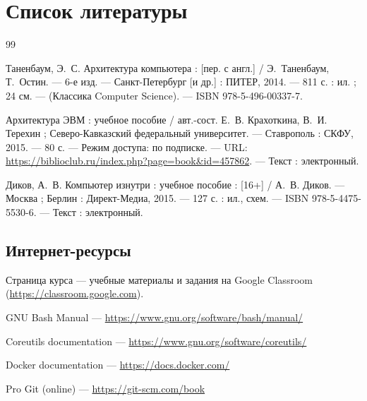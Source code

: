 \chapter{Список литературы}
\label{app:references}

\begin{thebibliography}{99}

Таненбаум, Э.~С. Архитектура компьютера : [пер. с англ.] / Э.~Таненбаум, Т.~Остин. --- 6-е изд. --- Санкт-Петербург [и др.] : ПИТЕР, 2014. --- 811 с. : ил. ; 24 см. --- (Классика Computer Science). --- ISBN 978-5-496-00337-7.

Архитектура ЭВМ : учебное пособие / авт.-сост. Е.~В. Крахоткина, В.~И. Терехин ; Северо-Кавказский федеральный университет. --- Ставрополь : СКФУ, 2015. --- 80 с. --- Режим доступа: по подписке. --- URL: \url{https://biblioclub.ru/index.php?page=book\&id=457862}. --- Текст : электронный.

Диков, А.~В. Компьютер изнутри : учебное пособие : [16+] / А.~В. Диков. --- Москва ; Берлин : Директ-Медиа, 2015. --- 127 с. : ил., схем. --- ISBN 978-5-4475-5530-6. --- Текст : электронный.

\end{thebibliography}

\section{Интернет-ресурсы}
\begin{description}
  \item{Страница курса} --- учебные материалы и задания на Google Classroom
  (\url{https://classroom.google.com}).
  \item{GNU Bash Manual} --- \url{https://www.gnu.org/software/bash/manual/}
  \item{Coreutils documentation} --- \url{https://www.gnu.org/software/coreutils/}
  \item{Docker documentation} --- \url{https://docs.docker.com/}
  \item{Pro Git (online)} --- \url{https://git-scm.com/book}
\end{description}
